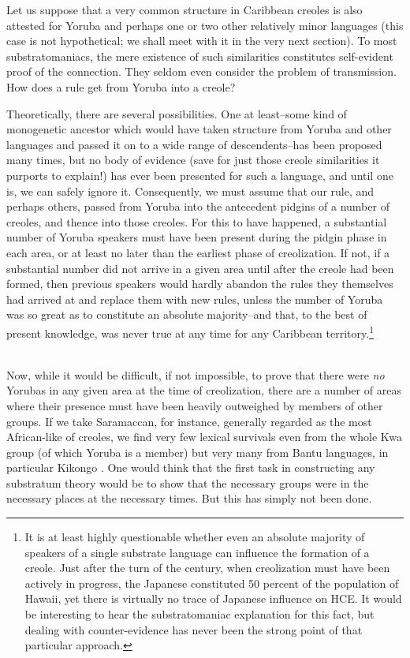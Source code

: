 Let us suppose that a very common structure in Caribbean creoles is also attested for Yoruba and perhaps one or two other rela\-tively minor languages (this case is not hypothetical; we shall meet with it in the very next section). To most substratomaniacs, the mere existence of such similarities constitutes self-evident proof of the connection. They seldom even consider the problem of transmission. How does a rule get from Yoruba into a creole?

Theoretically, there are several possibilities. One at least--some kind of monogenetic ancestor which would have taken structure from Yoruba and other languages and passed it on to a wide range of descen\-dents--has been proposed many times, but no body of evidence (save for just those creole similarities it purports to explain!) has ever been presented for such a language, and until one is, we can safely ignore it. Consequently, we must assume that our rule, and perhaps others, passed from Yoruba into the antecedent pidgins of a number of creoles, and thence into those creoles. For this to have happened, a substantial number of Yoruba speakers must have been present during the pidgin
phase in each area, or at least no later than the earliest phase of creoli\-zation. If not, if a substantial number did not arrive in a given area until after the creole had been formed, then previous speakers would hardly abandon the rules they themselves had arrived at and replace them with new rules, unless the number of Yoruba was so great as to constitute an absolute majority--and that, to the best of present knowledge, was never true at any time for any Caribbean territory.\footnote{It is at least highly questionable whether even an absolute majority of speakers of a single substrate language can influence the formation of a creole. Just after the turn of the century, when creolization must have been actively in progress, the Japanese constituted 50 percent of the population of Hawaii, yet there is virtually no trace of Japanese influence on HCE. It would be interesting to hear the substratomaniac explanation for this fact, but dealing with counter-evidence has never been the strong point of that particular approach.}\\\\

Now, while it would be difficult, if not impossible, to prove that there were \textit{no} Yorubas in any given area at the time of creolization, there are a number of areas where their presence must have been heavily outweighed by members of other groups. If we take Sara\-maccan, for instance, generally regarded as the most African-like of creoles, we find very few lexical survivals even from the whole Kwa group (of which Yoruba is a member) but very many from Bantu lan\-guages, in particular Kikongo \citep{Daeleman1972}. One would think that the first task in constructing any substratum theory would be to show that the necessary groups were in the necessary places at the necessary times. But this has simply not been done.

